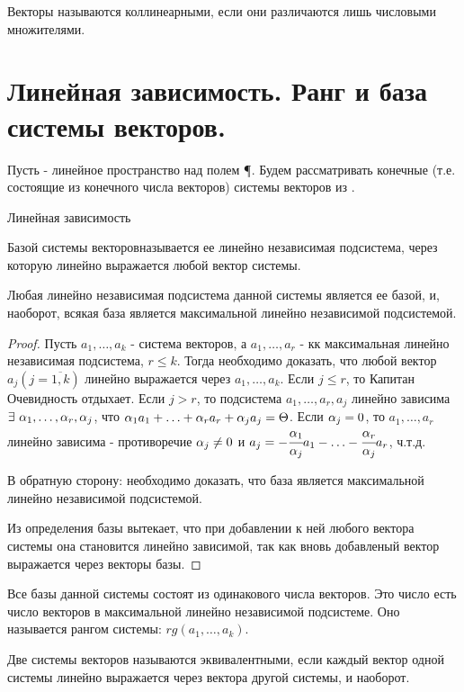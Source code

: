 \begin{opred}
Векторы называются коллинеарными, если они различаются лишь числовыми множителями.
\end{opred}
\section{Линейная зависимость. Ранг и база системы векторов.}
Пусть \V - линейное пространство над полем \P. Будем рассматривать конечные (т.е. состоящие из конечного числа векторов) системы векторов из \V.
\begin{opred}Линейная зависимость\end{opred}
\begin{opred}
Базой системы векторовназывается ее линейно независимая подсистема, через которую линейно выражается любой вектор системы.
\end{opred}
\begin{theor}
Любая линейно независимая подсистема данной системы является ее базой, и, наоборот, всякая база является максимальной линейно независимой подсистемой.
\end{theor}
\begin{proof}
Пусть $a_1,\ldots,a_k$ - система векторов, а $a_1,\ldots,a_r$ - кк максимальная линейно независимая подсистема, $r\leq k$. Тогда необходимо доказать, что любой вектор $a_j(j=\overline{1,k})$ линейно выражается через $a_1,\ldots,a_k$. Если $j\leq r$, то Капитан Очевидность отдыхает. Если $j>r$, то подсистема $a_1,\ldots,a_r,a_j$ линейно зависима \then $\exists\ \a_1,\ldots,\a_r,\a_j$, что $\alpha_1a_1+\ldots+\alpha_ra_r+\alpha_ja_j=\Theta$. Если $\alpha_j=0$, то $a_1,\ldots,a_r$ линейно зависима - противоречие \then $\alpha_j\neq0$ и $a_j=-\cfrac{\alpha_1}{\alpha_j}a_1-\ldots-\cfrac{\alpha_r}{\alpha_j}a_r$, ч.т.д.

В обратную сторону: необходимо доказать, что база является максимальной линейно независимой подсистемой.

Из определения базы вытекает, что при добавлении к ней любого вектора системы она становится линейно зависимой, так как вновь добавленый вектор выражается через векторы базы.
\end{proof}
\begin{effect}
Все базы данной системы состоят из одинакового числа векторов. Это число есть число векторов в максимальной линейно независимой подсистеме. Оно называется рангом системы: $rg(a_1,\ldots,a_k)$.
\end{effect}
\begin{opred}
Две системы векторов называются эквивалентными, если каждый вектор одной системы линейно выражается через вектора другой системы, и наоборот.
\end{opred}

